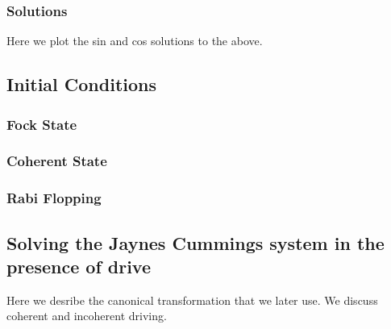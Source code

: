 \subsubsection{Solutions}
Here we plot the sin and cos solutions to the above. 
\subsection{Initial Conditions}
\subsubsection{Fock State}
\subsubsection{Coherent State}
\subsubsection{Rabi Flopping}
\subsection{Solving the Jaynes Cummings system in the presence of drive}
Here we desribe the canonical transformation that we later use.
We discuss coherent and incoherent driving.
